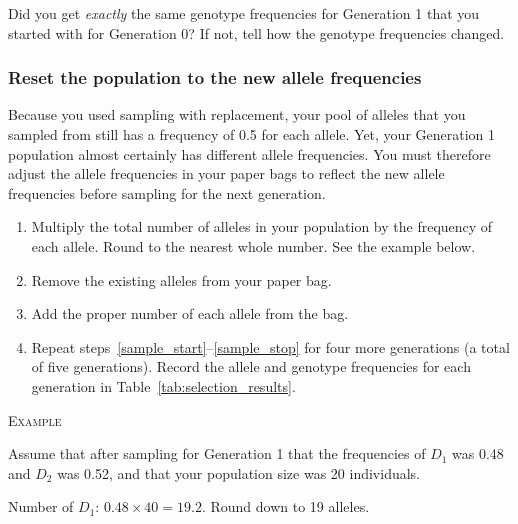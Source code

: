 \documentclass[12pt]{exam}
\newcommand{\allele}[1]{$#1$}
\begin{document}
\begin{questions}
	
	\question
	Did you get \emph{exactly} the same genotype frequencies for
	Generation 1 that you started with for Generation 0? If not,
	tell how the genotype frequencies changed. 
	
	\vspace*{5\baselineskip}
	
\subsubsection*{Reset the population to the new allele frequencies}

Because you used sampling with replacement, your pool of alleles that you sampled from still has a frequency of 0.5 for each 
allele. Yet, your Generation 1 population almost certainly has 
different allele frequencies.  You must therefore adjust the
allele frequencies in your paper bags to reflect the new allele 
frequencies before sampling for the next generation.

\begin{enumerate} [resume]

	\item Multiply the total number of alleles in your population by the frequency of each allele. Round to the nearest whole number. See the example below.
	
	\item Remove the existing alleles from your paper bag.
	
	\item \label{sample_stop} Add the proper number of each allele from the bag.
	
	\item Repeat steps~\ref{sample_start}–\ref{sample_stop} for four more generations (a total of five generations). Record the allele and genotype frequencies for each generation in Table~\ref{tab:selection_results}. %
	
\end{enumerate} 

	\medskip
	
	\textsc{Example} 
	
	Assume that after sampling for Generation 1 that the frequencies of \allele{D_1} was 0.48 and \allele{D_2} was 0.52, and that your population size was 20 individuals.
	
	Number of \allele{D_1}: $0.48 \times 40 = 19.2.$ Round down to 19 alleles.
	

\end{questions}
\end{document}
